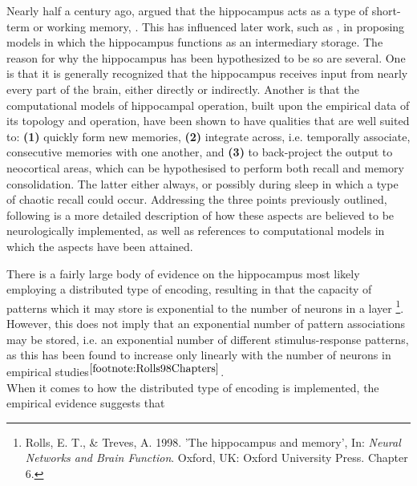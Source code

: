 
Nearly half a century ago, \cite{Marr1971} argued that the hippocampus acts as a type of short-term or working memory, \citep{Rolls1998chpt6}. This has influenced later work, such as \citep{McClelland1995}, in proposing models in which the hippocampus functions as an intermediary storage. The reason for why the hippocampus has been hypothesized to be so are several. One is that it is generally recognized that the hippocampus receives input from nearly every part of the brain, either directly or indirectly. Another is that the computational models of hippocampal operation, built upon the empirical data of its topology and operation, have been shown to have qualities that are well suited to: \textbf{(1)} quickly form new memories, \textbf{(2)} integrate across, i.e. temporally associate, consecutive memories with one another, and \textbf{(3)} to back-project the output to neocortical areas, which can be hypothesised to perform both recall and memory consolidation. The latter either always, or possibly during sleep in which a type of chaotic recall could occur. Addressing the three points previously outlined, following is a more detailed description of how these aspects are believed to be neurologically implemented, as well as references to computational models in which the aspects have been attained.

There is a fairly large body of evidence on the hippocampus most likely employing a distributed type of encoding, resulting in that the capacity of patterns which it may store is exponential to the number of neurons in a layer
\footnote{\label{footnote:Rolls98Chapters}Rolls, E. T., \& Treves, A. 1998. 'The hippocampus and memory', In: \textit{Neural Networks and Brain Function}. Oxford, UK: Oxford University Press. Chapter 6.}. However, this does not imply that an exponential number of pattern associations may be stored, i.e. an exponential number of different stimulus-response patterns, as this has been found to increase only linearly with the number of neurons in empirical studies$^{\ref{footnote:Rolls98Chapters}}$.
\\

When it comes to how the distributed type of encoding is implemented, the empirical evidence suggests that 


